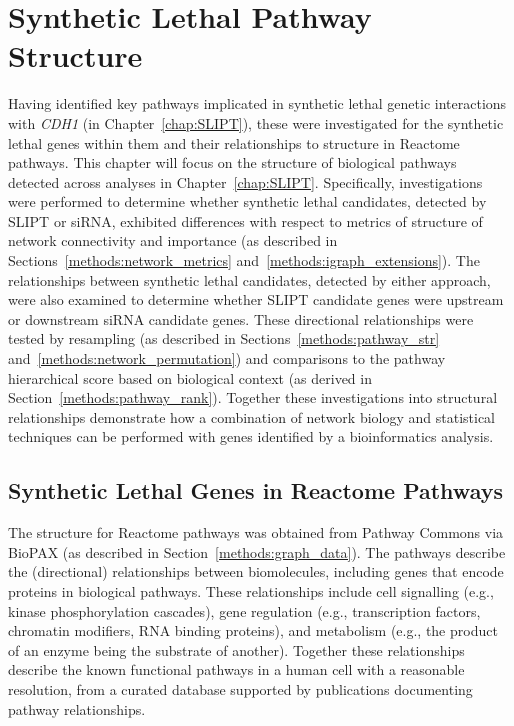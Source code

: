 \chapter{Synthetic Lethal Pathway Structure}
\label{chap:Pathways}
  
Having identified key pathways implicated in \gls{synthetic lethal} genetic interactions with \textit{CDH1} (in Chapter~\ref{chap:SLIPT}), these were investigated for the \gls{synthetic lethal} genes within them and their relationships to  structure in Reactome pathways. This chapter will focus on the  structure of biological pathways detected across analyses in Chapter~\ref{chap:SLIPT}. 
%
Specifically, investigations were performed to determine whether \gls{synthetic lethal} candidates, detected by \gls{SLIPT} or \gls{siRNA}, exhibited differences with respect to metrics of  structure of network connectivity and importance (as described in Sections~\ref{methods:network_metrics} and~\ref{methods:igraph_extensions}). The relationships between \gls{synthetic lethal} candidates, detected by either approach, were also examined to determine whether \gls{SLIPT} candidate genes were upstream or downstream \gls{siRNA} candidate genes. These directional relationships were tested by resampling (as described in Sections~\ref{methods:pathway_str} and~\ref{methods:network_permutation}) and comparisons to the pathway hierarchical score based on biological context (as derived in Section~\ref{methods:pathway_rank}). 
%
Together these investigations into structural relationships demonstrate how a combination of network biology and statistical techniques can be performed with genes identified by a \gls{bioinformatics} analysis.

\FloatBarrier

\section{Synthetic Lethal Genes in Reactome Pathways} \label{chapt4:SL_Genes}

\FloatBarrier

The  structure for Reactome pathways was obtained from Pathway Commons via \gls{BioPAX} (as described in Section~\ref{methods:graph_data}). The pathways describe the (directional) relationships between biomolecules, including genes that encode proteins in biological pathways. These relationships include cell signalling (e.g., kinase phosphorylation cascades), gene regulation (e.g., transcription factors, chromatin modifiers, \acrshort{RNA} binding proteins), and metabolism (e.g., the product of an enzyme being the substrate of another). Together these relationships describe the known functional pathways in a human cell with a reasonable resolution, from a curated database supported by publications documenting pathway relationships. 

